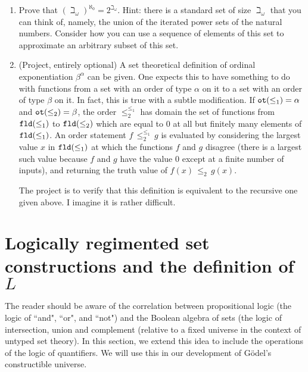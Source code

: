\documentclass[12pt]{book}
\begin{document}
\begin{enumerate}
\item Prove that $(\beth_{\omega})^{\aleph_0} = 2^{\beth_{\omega}}$.  Hint:  there is a standard set of size $\beth_{\omega}$ that you can think of, namely, the union of the iterated power sets of the natural numbers.  Consider how you can use a sequence of elements of this set to approximate an arbitrary subset of this set.

\item (Project, entirely optional)  A set theoretical definition of ordinal exponentiation $\beta^{\alpha}$ can be given.  One expects this to have something to do with functions from a set with an order of type $\alpha$ on it to a set with an order of type $\beta$ on it.  In fact, this is true with a subtle modification.
If ${\tt ot}(\leq_1) = \alpha$ and ${\tt ot}(\leq_2)= \beta$, the order $\leq_2^{\leq_1}$ has domain the set of functions from ${\tt fld}(\leq_1)$
to ${\tt fld}(\leq_2)$ which are equal to 0 at all but finitely many elements of ${\tt fld}(\leq_1)$.  An order statement $f \, \leq_2^{\leq_1}\,g$ is evaluated by considering the largest value $x$ in ${\tt fld}(\leq_1)$ at which the functions $f$ and $g$ disagree (there is a largest such value because $f$ and $g$ have the value 0 except at a finite number of inputs), and returning the truth value of $f(x) \, \leq_2 \, g(x)$.

The project is to verify that this definition is equivalent to the recursive one given above.  I imagine it is rather difficult.

\end{enumerate}


\newpage

\section{Logically regimented set constructions and the definition of $L$}

The reader should be aware of the correlation between propositional logic (the logic of ``and", ``or", and ``not") and the Boolean algebra of sets (the logic of intersection, union and complement (relative to a fixed universe in the context of untyped set theory).   In this section, we extend this idea to include the operations of the logic of quantifiers.  We will use this in our development of G\"odel's constructible universe.
\end{document}
